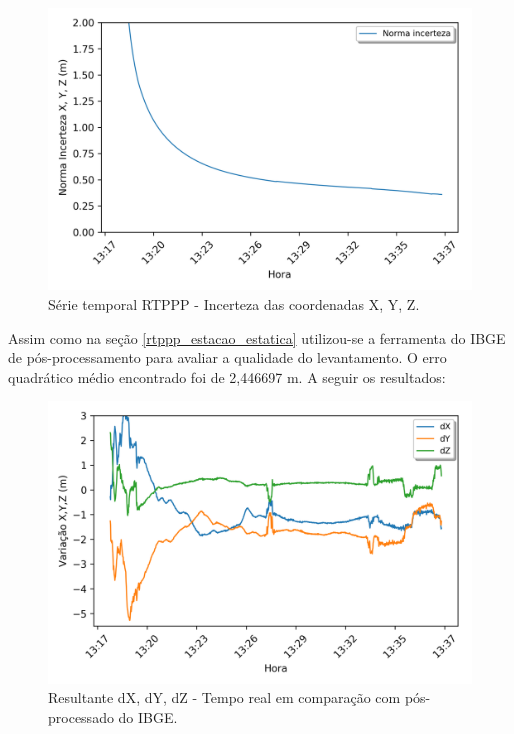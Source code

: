 \begin{figure}[H]
\centering
\includegraphics[scale=0.9]{data/Graphics/RJ_T20721/RJ_T20721_graphic_uncertainty.png}
\caption{Série temporal RTPPP - Incerteza das coordenadas X, Y, Z.}
\label{incerteza_20721}
\end{figure}


Assim como na seção \ref{rtppp_estacao_estatica} utilizou-se a ferramenta do IBGE de pós-processamento para avaliar a qualidade do levantamento. O erro quadrático médio encontrado foi de 2,446697 m. A seguir os resultados:

\begin{figure}[H]
\centering
\includegraphics[scale=0.9]{data/Graphics/RJ_T20721/RJ_T20721_comparison_graphic_xyz.png}
\caption{Resultante dX, dY, dZ - Tempo real em comparação com pós-processado do IBGE.}
\label{comp_xyz_20721}
\end{figure}


